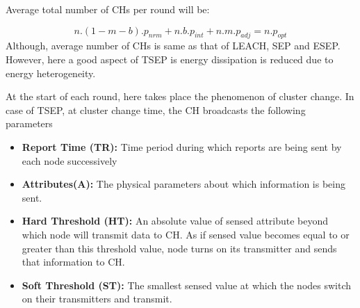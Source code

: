 \documentclass[conference]{IEEEtran}
\begin{document}
Average total number of CHs per round will be:

\begin{equation}
n.(1-m-b).p_{nrm}+n.b.p_{int}+n.m.p_{adj}=n.p_{opt}
\end{equation}
Although, average number of CHs is same as that of LEACH, SEP and ESEP. However, here a good aspect of TSEP is energy dissipation is reduced due to energy heterogeneity.

At the start of each round, here takes place the phenomenon of cluster change. In case of TSEP, at cluster change time, the CH broadcasts the following parameters\\
\begin{itemize}
  \item \textbf{Report Time (TR):} Time period during which reports are being sent by each node successively\\
  \item \textbf{Attributes(A):} The physical parameters about which information is being sent.\\
  \item \textbf{Hard Threshold (HT):} An absolute value of sensed attribute beyond which node will transmit data to CH. As if sensed value becomes equal to or greater than this threshold value, node turns on its transmitter and sends that information to CH.\\
  \item \textbf{Soft Threshold (ST):} The smallest sensed value at which the nodes switch on their transmitters and transmit.\\

\end{itemize}
\end{document}
